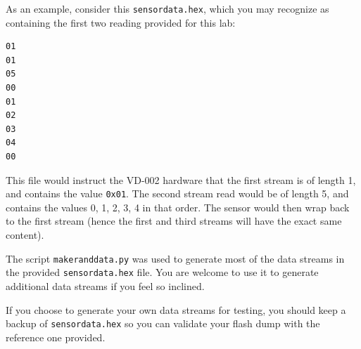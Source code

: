 \documentclass{article}
\begin{document}
As an example, consider this \texttt{sensordata.hex}, which you may recognize
as containing the first two reading provided for this lab:

\begin{verbatim}
01
01
05
00
01
02
03
04
00
\end{verbatim}

This file would instruct the VD-002 hardware that the first stream is of length
1, and contains the value \texttt{0x01}. The second stream read would be of
length 5, and contains the values 0, 1, 2, 3, 4 in that order. The sensor would
then wrap back to the first stream (hence the first and third streams will have
the exact same content).

The script \texttt{makeranddata.py} was used to generate most of the data
streams in the provided \texttt{sensordata.hex} file. You are welcome to use it
to generate additional data streams if you feel so inclined.

If you choose to generate your own data streams for testing, you should keep a
backup of \texttt{sensordata.hex} so you can validate your flash dump with the
reference one provided.
\end{document}
